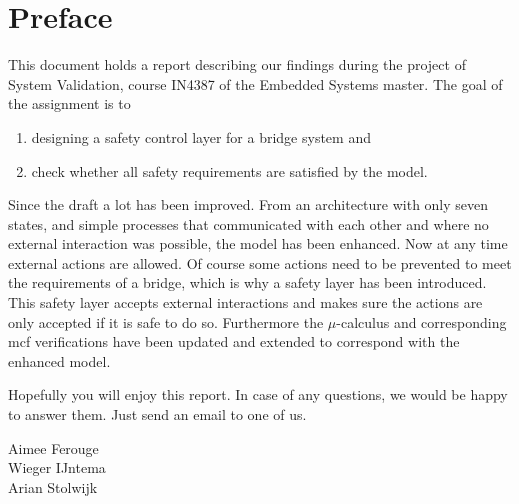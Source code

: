 \newpage
\section*{Preface}

This document holds a report describing our findings during the project of System Validation, course IN4387 of the Embedded Systems master.
The goal of the assignment is to
%
\begin{enumerate}
	\item designing a safety control layer for a bridge system and
	\item check whether all safety requirements are satisfied by the model.
\end{enumerate}
%

Since the draft a lot has been improved. From an architecture with only seven
states, and simple processes that communicated with each other and where no
external interaction was possible, the model has been enhanced. Now at any
time external actions are allowed. Of course some actions need to be prevented
to meet the requirements of a bridge, which is why a safety layer has been
introduced. This safety layer accepts external interactions and makes sure the
actions are only accepted if it is safe to do so. Furthermore the
$\mu$-calculus and corresponding mcf verifications have been updated and
extended to correspond with the enhanced model.

Hopefully you will enjoy this report. In case of any questions, we would be
happy to answer them. Just send an email to one of us.

\vspace{+50pt}
Aimee Ferouge\\
Wieger IJntema\\
Arian Stolwijk

